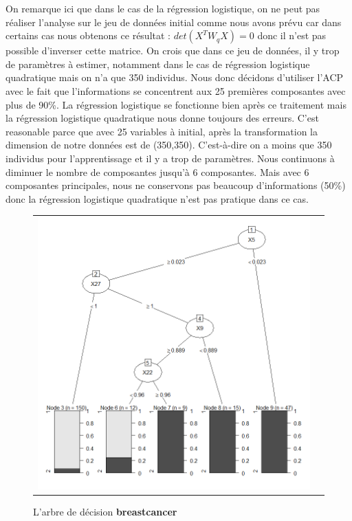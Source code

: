 \documentclass[a4paper,11pt,oneside,roman]{article}
\begin{document}
On remarque ici que dans le cas de la régression logistique, on ne peut pas réaliser l'analyse sur le jeu de données initial comme nous avons prévu car dans certains cas nous obtenons ce résultat : $det(X^{T}W_{q}X) =  0$ donc il n'est pas possible d'inverser cette matrice. On crois que dans ce jeu de données, il y trop de paramètres à estimer, notamment dans le cas de régression logistique quadratique mais on n'a que 350 individus. Nous donc décidons d'utiliser l'ACP avec le fait que l'informations se concentrent aux 25 premières composantes avec plus de 90\%. La régression logistique se fonctionne bien après ce traitement mais la régression logistique quadratique nous donne toujours des erreurs. C'est reasonable parce que avec 25 variables à initial, après la transformation la dimension de notre données est de (350,350). C'est-à-dire on a moins que 350 individus pour l'apprentissage et il y a trop de paramètres. Nous continuons à diminuer le nombre de composantes jusqu'à 6 composantes. Mais avec 6 composantes principales, nous ne conservons pas beaucoup d'informations (50\%) donc la régression logistique quadratique n'est pas pratique dans ce cas. \newline
\begin{figure}[htb]
    \centering
    \begin{tabular}{cc}
    \includegraphics[scale = .4]{./discrimination/ionosphere/tree_plot.png} &
    \end{tabular}
    \caption{L'arbre de décision \textbf{breastcancer}}
    \label{fig:my_label}
\end{figure}
\end{document}
